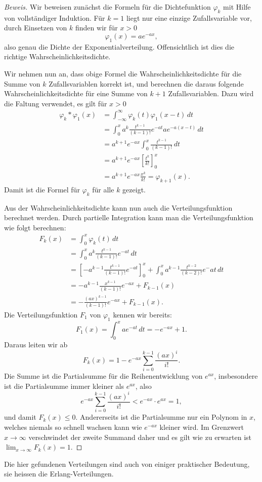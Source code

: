 \begin{proof}[Beweis]
Wir beweisen zunächst die Formeln für die Dichtefunktion $\varphi_k$ mit
Hilfe von vollständiger Induktion.
Für $k=1$ liegt nur eine einzige
Zufallsvariable vor, durch Einsetzen von $k$ finden wir für $x>0$
\[
\varphi_1(x)=ae^{-ax},
\]
also genau die Dichte der Exponentialverteilung.
Offensichtlich ist dies die richtige Wahrscheinlichkeitsdichte.

Wir nehmen nun an, dass obige Formel die Wahrscheinlichkeitsdichte für die
Summe von $k$ Zufallsvariablen korrekt ist, und berechnen die daraus
folgende Wahrscheinlichkeitsdichte für eine Summe von $k+1$ Zufallsvariablen.
Dazu wird die Faltung verwendet, es gilt für $x>0$
\begin{align*}
\varphi_k*\varphi_1(x)
&=
\int_{-\infty}^{\infty}\varphi_k(t)\varphi_1(x-t)\,dt\\
&=\int_0^x a^k\frac{t^{k-1}}{(k-1)!}e^{-at}ae^{-a(x-t)}\,dt\\
&=a^{k+1}e^{-ax}\int_0^x \frac{t^{k-1}}{(k-1)!}\,dt\\
&=a^{k+1}e^{-ax}\left[\frac{t^k}{k!}\right]_0^x\\
&=a^{k+1}e^{-ax}\frac{x^k}{k!}=\varphi_{k+1}(x).
\end{align*}
Damit ist die Formel für $\varphi_k$ für alle $k$ gezeigt.

Aus der Wahrscheinlichkeitsdichte kann nun auch die Verteilungsfunktion
berechnet werden.
Durch partielle Integration kann man die Verteilungsfunktion
wie folgt berechnen:
\begin{align*}
F_k(x)
&=\int_0^x\varphi_k(t)\,dt\\
&=\int_0^xa^k\frac{t^{k-1}}{(k-1)!}e^{-at}\,dt\\
&=\left[-a^{k-1}\frac{t^{k-1}}{(k-1)!}e^{-at}\right]_0^x+\int_0^xa^{k-1}\frac{t^{k-2}}{(k-2)!}e^-at\,dt\\
&=-a^{k-1}\frac{x^{k-1}}{(k-1)!}e^{-ax}+F_{k-1}(x)\\
&=-\frac{(ax)^{k-1}}{(k-1)!}e^{-ax}+F_{k-1}(x).
\end{align*}
Die Verteilungsfunktion $F_1$ von $\varphi_1$ kennen wir bereits:
\[
F_1(x)=\int_0^xae^{-at}\,dt=-e^{-ax}+1.
\]
Daraus leiten wir ab
\[
F_k(x)=1-e^{-ax}\sum_{i=0}^{k-1}\frac{(ax)^i}{i!}.
\]
Die Summe ist die Partialsumme für die Reihenentwicklung von $e^{ax}$,
insbesondere ist die Partialsumme immer kleiner als $e^{ax}$, also
\[
e^{-ax}\sum_{i=0}^{k-1}\frac{(ax)^i}{i!}<e^{-ax}\cdot e^{ax}=1,
\]
und damit $F_k(x) \le 0$.
Andererseits ist die Partialsumme nur ein
Polynom in $x$, welches niemals so schnell wachsen kann wie $e^{-ax}$ kleiner
wird.
Im Grenzwert $x\to\infty$ verschwindet der zweite Summand daher und
es gilt wie zu erwarten ist $\lim_{x\to\infty}F_k(x)=1$.
\end{proof}
Die hier gefundenen Verteilungen sind auch von einiger praktischer Bedeutung,
sie heissen die Erlang-Verteilungen.

